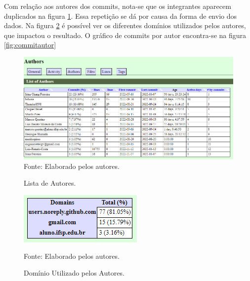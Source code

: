 \documentclass[
    12pt,               %
    openright,          %
    oneside,
    a4paper,            %
    BIBLATEX,           %
    TODO,               %
    english,            %
    brazil              %
    ]{ifsp-spo-inf-ctds}
\begin{document}
    Com relação aos autores dos commits, nota-se que os integrantes aparecem duplicados na figura \ref{fig:listaautores}. Essa repetição se dá por causa da forma de envio dos dados. Na figura \ref{fig:dominio} é possível ver os diferentes domínios utilizados pelos autores, que impactou o resultado. O gráfico de commits por autor encontra-se na figura \ref{fig:commitautor}
    
    \begin{figure}[H]
                \centering
                \caption{Lista de Autores.}
                \includegraphics[width=1 \textwidth]{Gitstats/documento/lista de autores.png}
                {\footnotesize Fonte: Elaborado pelos autores.}
                \label{fig:listaautores}
            \end{figure}
            
    \begin{figure}[H]
                \centering
                \caption{Domínio Utilizado pelos Autores.}
                \includegraphics[scale = 1.5]{Gitstats/documento/dominios1.png}
                
                {\footnotesize Fonte: Elaborado pelos autores.}
                \label{fig:dominio}
            \end{figure} 
            
\end{document}
